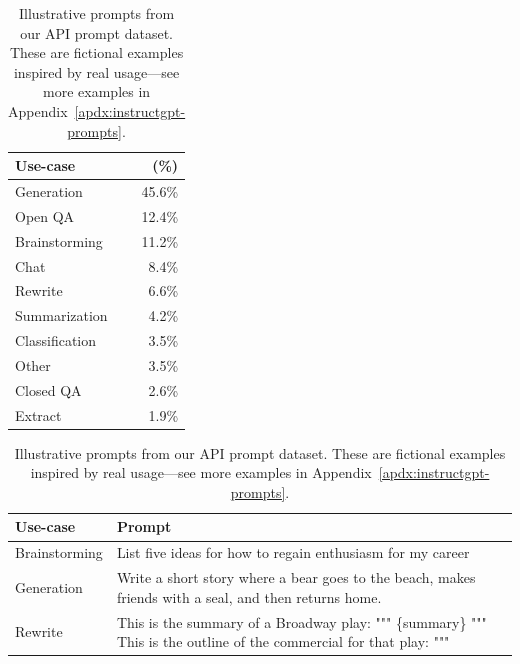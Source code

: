 \begin{table}
\parbox[t]{.3\linewidth}{
\centering
\footnotesize
\caption{Distribution of use case categories from our API prompt dataset.}
\label{tab:instruction-categories}
\begin{tabular}{lr}
    \toprule
    \textbf{Use-case}        & \textbf{(\%)} \\
    \midrule
    Generation      & 45.6\% \\
    Open QA         & 12.4\% \\
    Brainstorming   & 11.2\% \\
    Chat            &  8.4\% \\
    Rewrite         &  6.6\% \\
    Summarization   &  4.2\% \\
    Classification  &  3.5\% \\
    Other           &  3.5\% \\
    Closed QA       &  2.6\% \\
    Extract         &  1.9\% \\
\bottomrule
\end{tabular}
}
\hfill
\parbox[t]{.65\linewidth}{
\footnotesize
\caption{Illustrative prompts from our API prompt dataset. These are fictional examples inspired by real usage---see more examples in Appendix~\ref{apdx:instructgpt-prompts}.}
\label{tab:illustrative-prompts}
\begin{tabular}{p{} p{}}
\toprule
      \textbf{Use-case} &                                                                                            \textbf{Prompt} \\ \midrule
 Brainstorming &                                                                                                                                                                           List five ideas for how to regain enthusiasm for my career \\ \midrule
 Generation &                                                                                                                                                                                                                                                                                                                        Write a short story where a bear goes to the beach, makes friends with a seal, and then returns home. \\ \midrule
  Rewrite &                                                                                                                                                                                                                                                                                                 This is the summary of a Broadway play:{\newline} """{\newline} \{summary\}{\newline} """{\newline} This is the outline of the commercial for that play:{\newline} """ \\ 
  

\end{tabular}}
\end{table}
